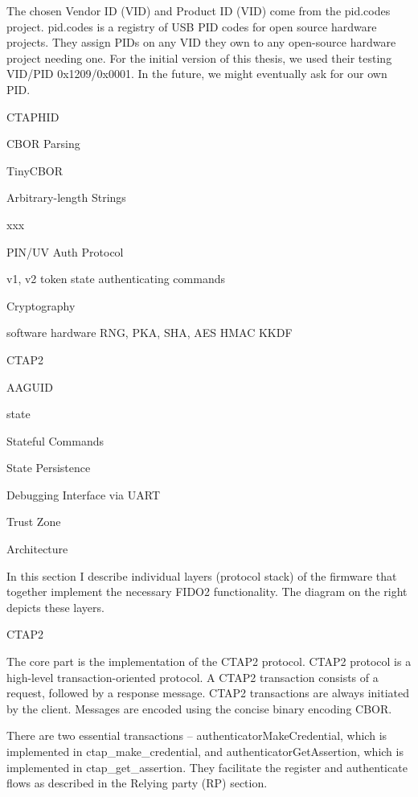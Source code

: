 The chosen Vendor ID (VID) and Product ID (VID) come from the pid.codes project.
pid.codes is a registry of USB PID codes for open source hardware projects. They assign PIDs on any VID they own to any open-source hardware project needing one.
For the initial version of this thesis, we used their testing VID/PID 0x1209/0x0001. In the future, we might eventually ask for our own PID.

\endinsert


\sec CTAPHID


\sec CBOR Parsing

TinyCBOR


\sec Arbitrary-length Strings

xxx


\sec PIN/UV Auth Protocol

v1, v2
token state
authenticating commands


\sec Cryptography

software
hardware
RNG, PKA, SHA, AES
HMAC
KKDF



\sec CTAP2


\secc AAGUID

state


\secc Stateful Commands


\sec State Persistence


\sec Debugging Interface via UART



\sec Trust Zone







\sec Architecture

In this section I describe individual layers (protocol stack) of the firmware that together implement the necessary FIDO2 functionality. The diagram on the right depicts these layers.


\secc CTAP2

The core part is the implementation of the CTAP2 protocol. CTAP2 protocol is a high-level transaction-oriented protocol. A CTAP2 transaction consists of a request, followed by a response message. CTAP2 transactions are always initiated by the client. Messages are encoded using the concise binary encoding CBOR.

There are two essential transactions – authenticatorMakeCredential, which is implemented in ctap_make_credential, and authenticatorGetAssertion, which is implemented in ctap_get_assertion. They facilitate the register and authenticate flows as described in the Relying party (RP) section.


